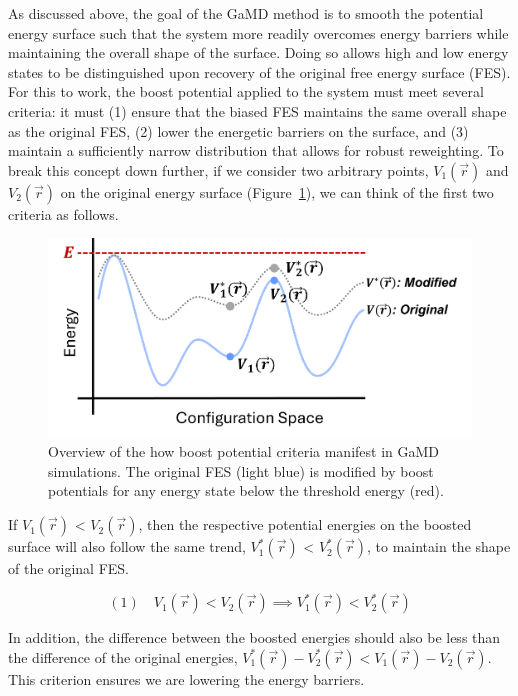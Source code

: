 \documentclass[9pt,tutorial]{livecoms}
\begin{document}
As discussed above, the goal of the GaMD method is to smooth the potential energy surface such that the system more readily overcomes energy barriers while maintaining the overall shape of the surface. Doing so allows high and low energy states to be distinguished upon recovery of the original free energy surface (FES). For this to work, the boost potential applied to the system must meet several criteria: it must (1) ensure that the biased FES maintains the same overall shape as the original FES, (2) lower the energetic barriers on the surface, and (3) maintain a sufficiently narrow distribution that allows for robust reweighting. To break this concept down further, if we consider two arbitrary points, $V_{1}(\vec{r})$ and $V_{2}(\vec{r})$ on the original energy surface (Figure~\ref{fig:criteria12}), we can think of the first two criteria as follows. 

\bigskip
\begin{figure}[h] 
    \includegraphics[width=\columnwidth]{main_figs/criteria1_2.png}
    \caption{Overview of the how boost potential criteria manifest in GaMD simulations. The original FES (light blue) is modified by boost potentials for any energy state below the threshold energy (red).}
    \label{fig:criteria12}
\end{figure}

If $V_{1}(\vec{r})$ < $V_{2}(\vec{r})$, then the respective potential energies on the boosted surface will also follow the same trend, $V_{1}^{*}(\vec{r})$ < $V_{2}^{*}(\vec{r})$, to maintain the shape of the original FES. 

\begin{equation*}
    \boxed{(1)\quad V_{1}\left(\vec{r}\right) < V_{2}\left(\vec{r}\right) \implies V_{1}^{*}\left(\vec{r}\right) < V_{2}^{*}\left(\vec{r}\right)}
\end{equation*}

In addition, the difference between the boosted energies should also be less than the difference of the original energies, $V_{1}^{*}\left(\vec{r}\right) - V_{2}^{*}\left(\vec{r}\right) < V_{1}\left(\vec{r}\right) - V_{2}\left(\vec{r}\right)$. This criterion ensures we are lowering the energy barriers.
\end{document}
